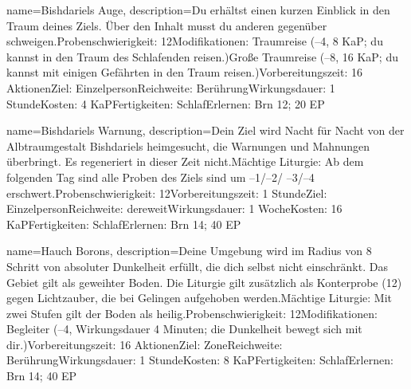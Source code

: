 {
    name={Bishdariels Auge},
    description={Du erhältst einen kurzen Einblick in den Traum deines Ziels. Über den Inhalt musst du anderen gegenüber schweigen.\newline Probenschwierigkeit: 12\newline Modifikationen: Traumreise (–4, 8 KaP; du kannst in den Traum des Schlafenden reisen.)\newline Große Traumreise (–8, 16 KaP; du kannst mit einigen Gefährten in den Traum reisen.)\newline Vorbereitungszeit: 16 Aktionen\newline Ziel: Einzelperson\newline Reichweite: Berührung\newline Wirkungsdauer: 1 Stunde\newline Kosten: 4 KaP\newline Fertigkeiten: Schlaf\newline Erlernen: Brn 12; 20 EP}
}


{
    name={Bishdariels Warnung},
    description={Dein Ziel wird Nacht für Nacht von der Albtraumgestalt Bishdariels heimgesucht, die Warnungen und Mahnungen überbringt. Es regeneriert in dieser Zeit nicht.\newline Mächtige Liturgie: Ab dem folgenden Tag sind alle Proben des Ziels sind um –1/–2/ –3/–4 erschwert.\newline Probenschwierigkeit: 12\newline Vorbereitungszeit: 1 Stunde\newline Ziel: Einzelperson\newline Reichweite: dereweit\newline Wirkungsdauer: 1 Woche\newline Kosten: 16 KaP\newline Fertigkeiten: Schlaf\newline Erlernen: Brn 14; 40 EP}
}


{
    name={Hauch Borons},
    description={Deine Umgebung wird im Radius von 8 Schritt von absoluter Dunkelheit erfüllt, die dich selbst nicht einschränkt. Das Gebiet gilt als geweihter Boden. Die Liturgie gilt zusätzlich als Konterprobe (12) gegen Lichtzauber, die bei Gelingen aufgehoben werden.\newline Mächtige Liturgie: Mit zwei Stufen gilt der Boden als heilig.\newline Probenschwierigkeit: 12\newline Modifikationen: Begleiter (–4, Wirkungsdauer 4 Minuten; die Dunkelheit bewegt sich mit dir.)\newline Vorbereitungszeit: 16 Aktionen\newline Ziel: Zone\newline Reichweite: Berührung\newline Wirkungsdauer: 1 Stunde\newline Kosten: 8 KaP\newline Fertigkeiten: Schlaf\newline Erlernen: Brn 14; 40 EP}
}


